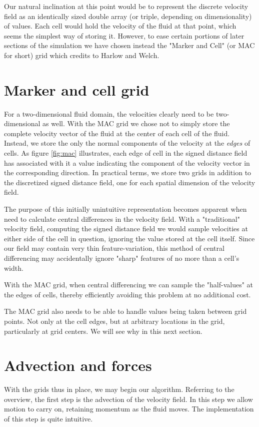 Our natural inclination at this point would be to represent the
discrete velocity field as an identically sized double array (or triple,
depending on dimensionality) of values. Each cell would hold the
velocity of the fluid at that point, which seems the simplest way of
storing it. However, to ease certain portions of later sections of the
simulation we have chosen instead the "Marker and Cell" (or MAC for
short) grid which  credits to Harlow and Welch.

\section{Marker and cell grid}
For a two-dimensional fluid domain, the velocities clearly need to be
two-dimensional as well. With the MAC grid we chose not to simply
store the complete velocity vector of the fluid at the center of each
cell of the fluid. Instead, we store the only the normal components of
the velocity at the \textit{edges} of cells. As figure \vref{fig:mac} illustrates, each edge of
cell in the signed distance field has associated with it a value
indicating the component of the velocity vector in the corresponding
direction. In practical terms, we store two grids in addition to the
discretized signed distance field, one for each spatial dimension of the velocity field.

The purpose of this initially unintuitive representation becomes
apparent when need to calculate central differences in the velocity
field. With a "traditional" velocity field, computing the signed
distance field we would sample velocities at either side of the cell
in question, ignoring the value stored at the cell itself. Since our
field may contain very thin feature-variation, this method of central
differencing may accidentally ignore "sharp" features of no more than
a cell's width.

With the MAC grid, when central differencing we can sample the
"half-values" at the edges of cells, thereby efficiently avoiding this
problem at no additional cost.

The MAC grid also needs to be able to handle values being taken
between grid points. Not only at the cell edges, but at arbitrary
locations in the grid, particularly at grid centers. We will see why
in this next section.

\section{Advection and forces}
With the grids thus in place, we may begin our algorithm. Referring to
the overview, the first step is the advection of the velocity
field. In this step we allow motion to carry on, retaining momentum as
the fluid moves. The implementation of this step is quite intuitive.

